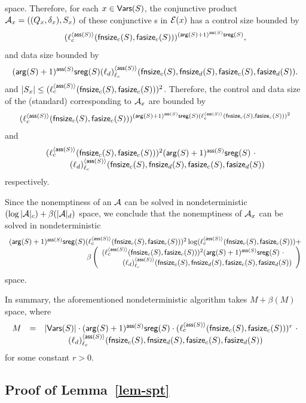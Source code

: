 \noindent space. 
Therefore, for each $x \in \mathsf{Vars}(S)$, the conjunctive product \SA{} $\mathcal{A}_x=((Q_x, \delta_x), S_x)$ of these conjunctive \SA{}s  in $\mathcal{E}(x)$ has a control size bounded by 
%
$$(\ell^{\langle \mathsf{ass}(S) \rangle}_c(\mathsf{fnsize}_c(S), \mathsf{fasize}_c(S)))^{(\mathsf{arg}(S)+1)^{\mathsf{ass}(S)} \mathsf{sreg}(S)},$$
%
and data size bounded by
%
\[ (\mathsf{arg}(S)+1)^{\mathsf{ass}(S)} \mathsf{sreg}(S) (\ell_d)^{\langle  \mathsf{ass}(S) \rangle}_{\ell_c}(\mathsf{fnsize}_c(S),\mathsf{fnsize}_d(S),  \mathsf{fasize}_c(S), \mathsf{fasize}_d(S)).\]
%
and $|S_x| \le (\ell_c^{\langle \mathsf{ass}(S) \rangle}(\mathsf{fnsize}_c(S), \mathsf{fasize}_c(S)))^2$. 
Therefore, the control and data size of the (standard) \SA{} corresponding to $\mathcal{A}_x$ are  bounded by 
%
$$(\ell^{\langle \mathsf{ass}(S) \rangle}_c(\mathsf{fnsize}_c(S), \mathsf{fasize}_c(S)))^{(\mathsf{arg}(S)+1)^{\mathsf{ass}(S)} \mathsf{sreg}(S) (\ell_c^{\langle \mathsf{ass}(S) \rangle}(\mathsf{fnsize}_c(S), \mathsf{fasize}_c(S)))^2}$$
%
and
$$
\begin{array}{l}
(\ell_c^{\langle \mathsf{ass}(S) \rangle}(\mathsf{fnsize}_c(S), \mathsf{fasize}_c(S)))^2 (\mathsf{arg}(S)+1)^{\mathsf{ass}(S)} \mathsf{sreg}(S)\ \cdot  \\
\hspace{1cm}(\ell_d)^{\langle  \mathsf{ass}(S) \rangle}_{\ell_c}(\mathsf{fnsize}_c(S),\mathsf{fnsize}_d(S),  \mathsf{fasize}_c(S), \mathsf{fasize}_d(S))
\end{array}
$$
respectively.

Since the nonemptiness of an \SA{} $\mathcal{A}$ can be solved in nondeterministic $(\log |\mathcal{A}|_c) + \beta(|\mathcal{A}|_d)$ space, we conclude that the nonemptiness of $\mathcal{A}_x$ can be solved in nondeterministic 
{\small
$$
\begin{array}{l}
(\rcdim(S)+1)^{\rcdep(S)} \rcsreg(S) (\ell_c^{\langle \rcdep(S) \rangle}(\rcphi_c(S), \rcpsi_c(S)))^2 \log (\ell^{\langle \rcdep(S) \rangle}_c(\rcphi_c(S), \rcpsi_c(S)))+ \\
\hfill \beta
\left(
\begin{array}{l}
(\ell_c^{\langle \rcdep(S) \rangle}(\rcphi_c(S), \rcpsi_c(S)))^2 (\rcdim(S)+1)^{\rcdep(S)} \rcsreg(S)\ \cdot  \\
\hspace{1cm} (\ell_d)^{\langle  \rcdep(S) \rangle}_{\ell_c}(\rcphi_c(S),\rcphi_d(S),  \rcpsi_c(S), \rcpsi_d(S))
\end{array}
\right)
\end{array}
$$
}
space.

In summary, the aforementioned nondeterministic algorithm takes  $M + \beta(M)$ space, where 
%
$$
\begin{array}{l c l}
M & = & |\mathsf{Vars}(S)| \cdot (\mathsf{arg}(S)+1)^{\mathsf{ass}(S)}  \mathsf{sreg}(S) \cdot  (\ell_c^{\langle \mathsf{ass}(S) \rangle}(\mathsf{fnsize}_c(S), \mathsf{fasize}_c(S)))^{r}\ \cdot \\
& &  \hspace{1cm} (\ell_d)^{\langle  \mathsf{ass}(S) \rangle}_{\ell_c}(\mathsf{fnsize}_c(S),\mathsf{fnsize}_d(S),  \mathsf{fasize}_c(S), \mathsf{fasize}_d(S))
\end{array}
$$
%
for some constant $r > 0$.


\subsection{Proof of Lemma~\ref{lem-spt}}
